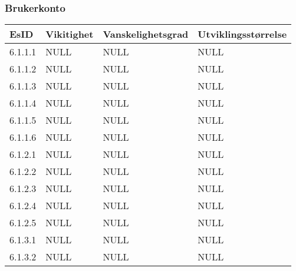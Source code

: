 \documentclass[12pt]{article}
\begin{document}
        \subsubsection{Brukerkonto}
        \begin{tabular}{|p{2cm}|p{4cm}|p{4cm}|p{4cm}| } 
            \hline
            \bf EsID & \bf Vikitighet & \bf Vanskelighetsgrad & \bf Utviklingsstørrelse\\
            \hline
            6.1.1.1 & NULL & NULL & NULL\\
            \hline
            6.1.1.2 & NULL & NULL & NULL\\
            \hline
            6.1.1.3 & NULL & NULL & NULL\\
            \hline
            6.1.1.4 & NULL & NULL & NULL\\
            \hline
            6.1.1.5 & NULL & NULL & NULL\\
            \hline
            6.1.1.6 & NULL & NULL & NULL\\
            \hline
            6.1.2.1 & NULL & NULL & NULL\\
            \hline
            6.1.2.2 & NULL & NULL & NULL\\
            \hline
            6.1.2.3 & NULL & NULL & NULL\\
            \hline
            6.1.2.4 & NULL & NULL & NULL\\
            \hline
            6.1.2.5 & NULL & NULL & NULL\\
            \hline
            6.1.3.1 & NULL & NULL & NULL\\
            \hline
            6.1.3.2 & NULL & NULL & NULL\\
            \hline
        \end{tabular}
    
\end{document}
